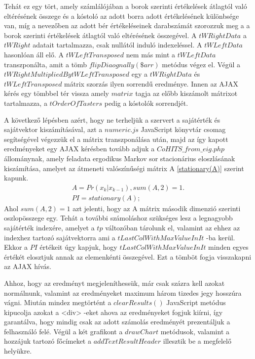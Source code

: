 \documentclass[12pt]{report}
\theoremstyle{definition}
\begin{document}
	Tehát ez egy tört, amely számlálójában a borok szerinti értékelések átlagtól való eltérésének összege és a kóstoló az adott borra adott értékelésének különbsége van, míg a nevezőben az adott bér értékeléseinek darabszámát szorozzuk meg a a borok szerinti értékelések átlagtól való eltérésének összegével. A $tWRightData$ a $tWRight$ adatait tartalmazza, csak nullától induló indexeléssel. A $tWLeftData$ hasonlóan áll elő. A  $tWLeftTransposed$ nem más mint a $tWLeftData$ transzponálta, amit a tömb \linebreak$flipDiaognally(\$arr)$ metódus végez el. Végül a \linebreak$tWRightMultipliedBytWLeftTransposed$ egy a $tWRightData$ és \linebreak$tWLeftTransposed$ mátrix szorzás ilyen sorrendű eredménye. Innen az AJAX kérés egy tömbbel tér vissza amely $matrix$ tagja az előbb kiszámolt mátrixot tartalmazza, a $tOrderOfTasters$ pedig a kóstolók sorrendjét.
	
	A következő lépésben azért, hogy ne terheljük a szervert a sajátérték és sajátvektor kiszámításával, azt a $numeric.js$ JavaScript könyvtár csomag segítségével végezzük el a mátrix transzponálása után, majd az így kapott eredményeket egy AJAX kérésben tovább adjuk a $CoHITS\_from\_eig.php$ állománynak, amely feladata ergodikus Markov sor stacionárius eloszlásának kiszámítása, amelyet az átmeneti valószínűségi mátrix A \ref{stationary(A)} szerint kapunk.
	\begin{equation} \label{stationary(A)}
	\begin{split}
	A = Pr\left(x_{k} | x_{k - 1}\right) , sum(A , 2) = 1. \\
	PI = stationary\left(A\right);
	\end{split}
	\end{equation}
	Ahol $sum\left(A, 2\right) = 1$ azt jelenti, hogy az A mátrix második dimenzió szerinti oszlopösszege egy. Tehát a további számoláshoz szükséges lesz a legnagyobb sajátérték indexére, amelyet a $tp$ változóban tárolunk el, valamint az ehhez az indexhez tartozó sajátvektorra ami a $tLastColWithMaxValueInIt$ -ba kerül. Ekkor a $PI$ értékeit úgy kapjuk, hogy $tLastColWithMaxValueInIt$ minden egyes értékét elosztjuk annak az elemenkénti összegével. Ezt a tömböt fogja visszakapni az AJAX hívás.
	
	Ahhoz, hogy az eredményt megjeleníthessük, már csak százra kell azokat normálnunk, valamint az eredményeket maximum három tizedes jegy hosszúra vágni. Miután mindez megtörtént a $clearResults\left(\right)$ JavaScript metódus kipucolja azokat a <div> -eket ahova az eredményeket fogjuk kiírni, így garantálva, hogy mindig csak az adott számolás eredményét prezentáljuk a felhasználó felé. Végül a két grafikont a $drawChart$ metódusok, valamint a hozzájuk tartozó főcímeket a $addTextResultHeader$ illesztik be a megfelelő helyükre.
	
\end{document}
